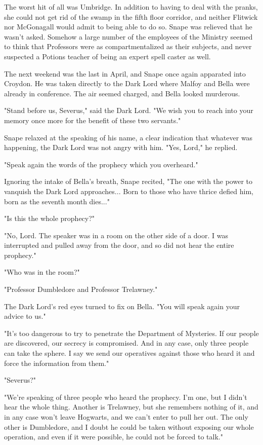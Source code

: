 \documentclass[a4paper,11pt]{article}
\begin{document}
The worst hit of all was Umbridge. In addition to having to deal with the pranks, she could not get rid of the swamp in the fifth floor corridor, and neither Flitwick nor McGonagall would admit to being able to do so. Snape was relieved that he wasn't asked. Somehow a large number of the employees of the Ministry seemed to think that Professors were as compartmentalized as their subjects, and never suspected a Potions teacher of being an expert spell caster as well.

The next weekend was the last in April, and Snape once again apparated into Croydon. He was taken directly to the Dark Lord where Malfoy and Bella were already in conference. The air seemed charged, and Bella looked murderous.

"Stand before us, Severus," said the Dark Lord. "We wish you to reach into your memory once more for the benefit of these two servants."

Snape relaxed at the speaking of his name, a clear indication that whatever was happening, the Dark Lord was not angry with him. "Yes, Lord," he replied.

"Speak again the words of the prophecy which you overheard."

Ignoring the intake of Bella's breath, Snape recited, "The one with the power to vanquish the Dark Lord approaches... Born to those who have thrice defied him, born as the seventh month dies..."

"Is this the whole prophecy?"

"No, Lord. The speaker was in a room on the other side of a door. I was interrupted and pulled away from the door, and so did not hear the entire prophecy."

"Who was in the room?"

"Professor Dumbledore and Professor Trelawney."

The Dark Lord's red eyes turned to fix on Bella. "You will speak again your advice to us."

"It's too dangerous to try to penetrate the Department of Mysteries. If our people are discovered, our secrecy is compromised. And in any case, only three people can take the sphere. I say we send our operatives against those who heard it and force the information from them."

"Severus?"

"We're speaking of three people who heard the prophecy. I'm one, but I didn't hear the whole thing. Another is Trelawney, but she remembers nothing of it, and in any case won't leave Hogwarts, and we can't enter to pull her out. The only other is Dumbledore, and I doubt he could be taken without exposing our whole operation, and even if it were possible, he could not be forced to talk."
\end{document}
